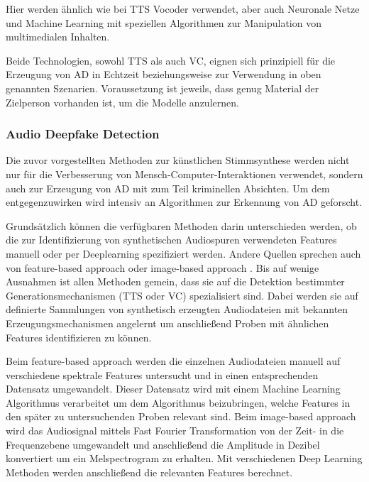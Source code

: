Hier werden ähnlich wie bei TTS Vocoder verwendet, aber auch Neuronale Netze und Machine Learning mit speziellen Algorithmen zur Manipulation von multimedialen Inhalten.

Beide Technologien, sowohl TTS als auch VC, eignen sich prinzipiell für die Erzeugung von AD in Echtzeit beziehungsweise zur Verwendung in oben genannten Szenarien.
Voraussetzung ist jeweils, dass genug Material der Zielperson vorhanden ist, um die Modelle anzulernen.
\clearpage

\subsubsection{Audio Deepfake Detection}
Die zuvor vorgestellten Methoden zur künstlichen Stimmsynthese werden nicht nur für die Verbesserung von Mensch-Computer-Interaktionen verwendet, sondern auch zur Erzeugung von AD mit zum Teil kriminellen Absichten.
Um dem entgegenzuwirken wird intensiv an Algorithmen zur Erkennung von AD geforscht.

Grundsätzlich können die verfügbaren Methoden darin unterschieden werden, ob die zur Identifizierung von synthetischen Audiospuren verwendeten Features manuell oder per Deeplearning spezifiziert werden.
Andere Quellen sprechen auch von feature-based approach oder image-based approach \citep[][]{Khochare2021}.
Bis auf wenige Ausnahmen ist allen Methoden gemein, dass sie auf die Detektion bestimmter Generationsmechanismen (TTS oder VC) spezialisiert sind.
Dabei werden sie auf definierte Sammlungen von synthetisch erzeugten Audiodateien mit bekannten Erzeugungsmechanismen angelernt um anschließend Proben mit ähnlichen Features identifizieren zu können.

Beim feature-based approach werden die einzelnen Audiodateien manuell auf verschiedene spektrale Features untersucht und in einen entsprechenden Datensatz umgewandelt.
Dieser Datensatz wird mit einem Machine Learning Algorithmus verarbeitet um dem Algorithmus beizubringen, welche Features in den später zu untersuchenden Proben relevant sind.
Beim image-based approach wird das Audiosignal mittels Fast Fourier Transformation von der Zeit- in die Frequenzebene umgewandelt und anschließend die Amplitude in Dezibel konvertiert um ein Melspectrogram zu erhalten.
Mit verschiedenen Deep Learning Methoden werden anschließend die relevanten Features berechnet.

